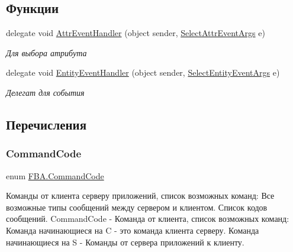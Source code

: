 \subsection*{Функции}
\begin{DoxyCompactItemize}
\item 
delegate void \mbox{\hyperlink{namespace_f_b_a_a0df7965ddd0519f1d83cbf05f2886d95}{Attr\+Event\+Handler}} (object sender, \mbox{\hyperlink{class_f_b_a_1_1_select_attr_event_args}{Select\+Attr\+Event\+Args}} e)
\begin{DoxyCompactList}\small\item\em Для выбора атрибута \end{DoxyCompactList}\item 
delegate void \mbox{\hyperlink{namespace_f_b_a_a05acb24d71f58b94b801674d2a8c5b17}{Entity\+Event\+Handler}} (object sender, \mbox{\hyperlink{class_f_b_a_1_1_select_entity_event_args}{Select\+Entity\+Event\+Args}} e)
\begin{DoxyCompactList}\small\item\em Делегат для события \end{DoxyCompactList}\end{DoxyCompactItemize}


\subsection{Перечисления}
\mbox{\label{namespace_f_b_a_abb5a0756c159f22dc419a5fcf5b6f3b5}} 
\subsubsection{\texorpdfstring{Command\+Code}{CommandCode}}
{\footnotesize\ttfamily enum \mbox{\hyperlink{namespace_f_b_a_abb5a0756c159f22dc419a5fcf5b6f3b5}{F\+B\+A.\+Command\+Code}}\hspace{0.3cm}{\ttfamily [strong]}}



Команды от клиента серверу приложений, список возможных команд\+: Все возможные типы сообщений между сервером и клиентом. Список кодов сообщений. Command\+Code -\/ Команда от клиента, список возможных команд\+: Команда начинающиеся на C -\/ это команда клиента серверу. Команда начинающиеся на S -\/ Команды от сервера приложений к клиенту. 

